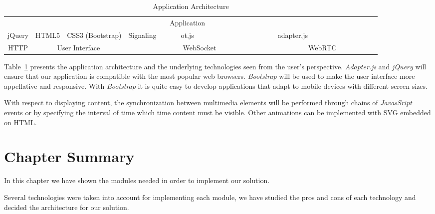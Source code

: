 \begin{table}[H]
\centering
	\caption{Application Architecture}
	\label{table:apparch}
    \begin{tabular}{cccccccc@{}m{0pt}@{}}
	\hline 
\multicolumn{8}{|c|}{\cellcolor{Gray}Application}  &\\[12pt]\cline{1-5}\cline{7-7}
\multicolumn{1}{|c|}{jQuery} & \multicolumn{1}{c|}{HTML5} & \multicolumn{1}{c|}{CSS3 (Bootstrap)} & \multicolumn{1}{c|}{Signaling} & \multicolumn{1}{c|}{~~~~~ot.js~~~~~} & \multicolumn{1}{c|}{\cellcolor{Gray}~~~~~~~~~~~~~~~} & \multicolumn{1}{c|}{adapter.js} &   \multicolumn{1}{c|}{\cellcolor{Gray}~~~~~~~~~~~~~~~} &\\[12pt]\hline
\multicolumn{1}{|c|}{HTTP} & \multicolumn{2}{c|}{User Interface}  & \multicolumn{3}{c|}{WebSocket}    & \multicolumn{2}{c|}{WebRTC}      &\\[12pt]\hline
\end{tabular}
\end{table}


Table~\ref{table:apparch} presents the application architecture and the underlying technologies seen from the user's perspective. \emph{Adapter.js} and \emph{jQuery} will ensure that our application is compatible with the most popular web browsers.
\emph{Bootstrap} will be used to make the user interface more appellative and responsive. With \emph{Bootstrap} it is quite easy to develop applications that adapt to mobile devices with different screen sizes.

With respect to displaying content, the synchronization between multimedia elements will be performed through chains of \emph{JavasSript} events or by specifying the interval of time which time content must be visible. Other animations can be implemented with \ac{SVG} embedded on \ac{HTML}.

\section{Chapter Summary}
\label{architecture:summary}

In this chapter we have shown the modules needed in order to implement our solution.

Several technologies were taken into account for implementing each module, we have studied the pros and cons of each technology and decided the architecture for our solution.


